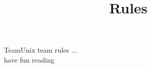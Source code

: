 \documentclass[10pt,a4paper]{article}
\title{Rules}
\begin{document}
TeamUnix team rules ...  \\have fun reading
\end{document}
